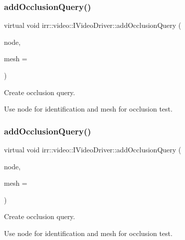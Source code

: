 \subsubsection{\texorpdfstring{add\+Occlusion\+Query()}{addOcclusionQuery()}\hspace{0.1cm}{\footnotesize\ttfamily [1/2]}}
{\footnotesize\ttfamily virtual void irr\+::video\+::\+I\+Video\+Driver\+::add\+Occlusion\+Query (\begin{DoxyParamCaption}\item[{\hyperlink{classirr_1_1scene_1_1ISceneNode}{scene\+::\+I\+Scene\+Node} $\ast$}]{node,  }\item[{const \hyperlink{classirr_1_1scene_1_1IMesh}{scene\+::\+I\+Mesh} $\ast$}]{mesh = {} }\end{DoxyParamCaption})\hspace{0.3cm}{\ttfamily [pure virtual]}}



Create occlusion query. 

Use node for identification and mesh for occlusion test. \mbox{\label{classirr_1_1video_1_1IVideoDriver_a07f15814e039772ee43be272e97d1633}} 
\subsubsection{\texorpdfstring{add\+Occlusion\+Query()}{addOcclusionQuery()}\hspace{0.1cm}{\footnotesize\ttfamily [2/2]}}
{\footnotesize\ttfamily virtual void irr\+::video\+::\+I\+Video\+Driver\+::add\+Occlusion\+Query (\begin{DoxyParamCaption}\item[{\hyperlink{classirr_1_1scene_1_1ISceneNode}{scene\+::\+I\+Scene\+Node} $\ast$}]{node,  }\item[{const \hyperlink{classirr_1_1scene_1_1IMesh}{scene\+::\+I\+Mesh} $\ast$}]{mesh = {} }\end{DoxyParamCaption})\hspace{0.3cm}{\ttfamily [pure virtual]}}



Create occlusion query. 

Use node for identification and mesh for occlusion test. \mbox{\label{classirr_1_1video_1_1IVideoDriver_aa704cece826ee37d02e4bb054b0b8797}} 
